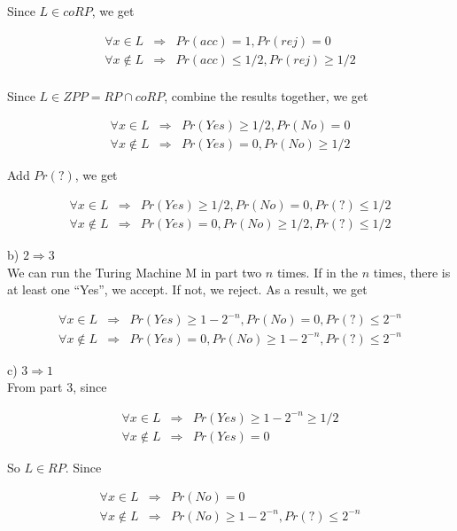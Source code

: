 \documentclass[12pt]{article}
\begin{document}
Since $L \in coRP$, we get

\begin{eqnarray*}
\forall x \in L &\Rightarrow& Pr(acc) = 1, Pr(rej) = 0 \\
\forall x \notin L &\Rightarrow& Pr(acc) \le 1/2, Pr(rej) \ge 1/2 \\
\end{eqnarray*}

Since $L \in ZPP = RP \cap coRP$, combine the results together, we get

\begin{eqnarray*}
\forall x \in L &\Rightarrow& Pr(Yes) \ge 1/2, Pr(No) = 0 \\
\forall x \notin L &\Rightarrow& Pr(Yes) = 0, Pr(No) \ge 1/2
\end{eqnarray*}

Add $Pr(?)$, we get

\begin{eqnarray*}
\forall x \in L &\Rightarrow& Pr(Yes) \ge 1/2, Pr(No) = 0, Pr(?) \le
1/2 \\
\forall x \notin L &\Rightarrow& Pr(Yes) = 0, Pr(No) \ge 1/2, Pr(?)
\le 1/2
\end{eqnarray*}

b) $2 \Rightarrow 3$ \\

We can run the Turing Machine M in part two  $n$ times. If in the
$n$ times, there is at least one ``Yes'', we accept. If not, we reject. As
a result, we get

\begin{eqnarray*}
\forall x \in L &\Rightarrow& Pr(Yes) \ge 1 - 2^{-n}, Pr(No) = 0, Pr(?)
\le 2^{-n} \\
\forall x \notin L &\Rightarrow& Pr(Yes) = 0, Pr(No) \ge 1 - 2^{-n},
Pr(?) \le 2^{-n}
\end{eqnarray*}

c) $3 \Rightarrow 1$ \\

From part 3, since

\begin{eqnarray*}
\forall x \in L &\Rightarrow& Pr(Yes) \ge 1 - 2^{-n} \ge 1/2\\
\forall x \notin L &\Rightarrow& Pr(Yes) = 0 
\end{eqnarray*}

So $L \in RP$. Since

\begin{eqnarray*}
\forall x \in L &\Rightarrow& Pr(No) = 0 \\
\forall x \notin L &\Rightarrow& Pr(No) \ge 1 - 2^{-n},
Pr(?) \le 2^{-n}
\end{eqnarray*}
\end{document}
